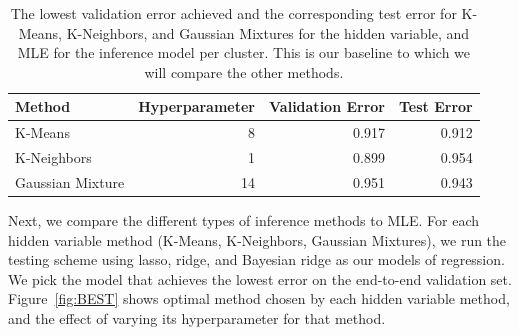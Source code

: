 \documentclass[11pt]{article}
\begin{document}
\begin{table}[h!]
    \begin{tabularx}{0.9\textwidth}{| X | r | r | r | }
        \hline
        Method & Hyperparameter & Validation Error & Test Error \\
        \hline
        K-Means & 8 & 0.917 & 0.912 \\
        K-Neighbors & 1 & 0.899 & 0.954 \\
        Gaussian Mixture & 14 & 0.951 & 0.943\\
        \hline
    \end{tabularx}
    \caption{The lowest validation error achieved and the corresponding test error for K-Means, K-Neighbors, and Gaussian Mixtures for the hidden variable, and MLE for the inference model per cluster. This is our baseline to which we will compare the other methods.}
    \label{tab:baseline}
\end{table}

Next, we compare the different types of inference methods to MLE. For each hidden variable method (K-Means, K-Neighbors, Gaussian Mixtures), we run the testing scheme using lasso, ridge, and Bayesian ridge as our models of regression. We pick the model that achieves the lowest error on the end-to-end validation set. Figure~\ref{fig:BEST} shows optimal method chosen by each hidden variable method, and the effect of varying its hyperparameter for that method. 
\end{document}
